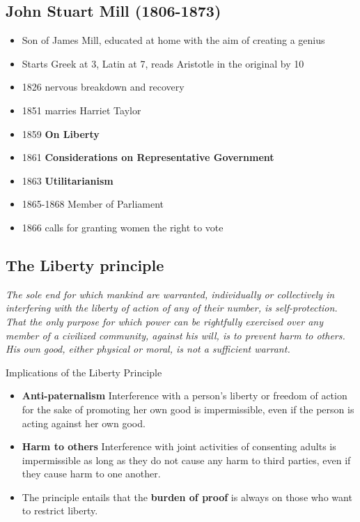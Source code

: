 \subsection{John Stuart Mill (1806-1873)}

\begin{itemize}
    \item Son of James Mill, educated at home with the aim of creating
    a genius
    \item Starts Greek at 3, Latin at 7, reads Aristotle in the original by 10
    \item 1826 nervous breakdown and recovery
    \item 1851 marries Harriet Taylor
    \item 1859 \textbf{On Liberty}
    \item 1861 \textbf{Considerations on Representative Government}
    \item 1863 \textbf{Utilitarianism}
    \item 1865-1868 Member of Parliament
    \item 1866 calls for granting women the right to vote
\end{itemize}

\subsection{The Liberty principle}

\textit{The sole end for which mankind are warranted, individually or
collectively in interfering with the liberty of action of any of their number,
is self-protection. That the only purpose for which power can be rightfully
exercised over any member of a civilized community, against his will, is to
prevent harm to others. His own good, either physical or moral, is not
a sufficient warrant.}

Implications of the Liberty Principle

\begin{itemize}
    \item \textbf{Anti-paternalism} Interference with a person's liberty or
    freedom of action for the sake of promoting her own good is impermissible,
    even if the person is acting against her own good.
    \item \textbf{Harm to others} Interference with joint activities of
    consenting adults is impermissible as long as they do not cause any harm
    to third parties, even if they cause harm to one another.
    \item The principle entails that the \textbf{burden of proof} is always on
    those who want to restrict liberty.
\end{itemize}

